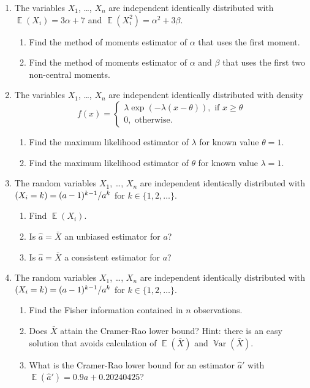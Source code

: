 \documentclass[12pt]{article}
\DeclareMathOperator{\Var}{\mathbb{V}ar}
\let\P\relax
\DeclareMathOperator{\P}{\mathbb{P}}
\DeclareMathOperator{\E}{\mathbb{E}}
\begin{document}
\begin{enumerate}

\item The variables $X_1$, \ldots, $X_n$ are independent identically distributed with $\E(X_i) = 3\alpha + 7$ and $\E(X_i^2) = \alpha^2 + 3\beta$.
\begin{enumerate}
  \item Find the method of moments estimator of $\alpha$ that uses the first moment. 
  \item Find the method of moments estimator of $\alpha$ and $\beta$ that uses the first two non-central moments. 
\end{enumerate}

\item The variables $X_1$, \ldots, $X_n$ are independent identically distributed with density 
\[
f(x) = \begin{cases}
  \lambda \exp(-\lambda (x - \theta)), \text{ if } x\geq \theta \\
  0, \text{ otherwise}.
\end{cases}  
\]
\begin{enumerate}
  \item Find the maximum likelihood estimator of $\lambda$ for known value $\theta = 1$. 
  \item Find the maximum likelihood estimator of $\theta$ for known value $\lambda = 1$. 
\end{enumerate}

\item The random variables $X_1$, \ldots, $X_n$ are independent identically distributed with 
$\P(X_i = k) = (a - 1)^{k-1}/a^k$ for $k \in \{1, 2, \ldots \}$. 

\begin{enumerate}
  \item Find $\E(X_i)$.
  \item Is $\hat a = \bar X$ an unbiased estimator for $a$?
  \item Is $\hat a = \bar X$ a consistent estimator for $a$?
\end{enumerate}

\item The random variables $X_1$, \ldots, $X_n$ are independent identically distributed with 
$\P(X_i = k) = (a - 1)^{k-1}/a^k$ for $k \in \{1, 2, \ldots \}$. 

\begin{enumerate}
  \item Find the Fisher information contained in $n$ observations. 
  \item Does $\bar X$ attain the Cramer-Rao lower bound?
  Hint: there is an easy solution that avoids calculation of $\E(\bar X)$ and $\Var(\bar X)$.
  \item What is the Cramer-Rao lower bound for an estimator $\hat a'$ with $\E(\hat a') = 0.9 a + 0.20240425$?
\end{enumerate}


\end{enumerate}
\end{document}
